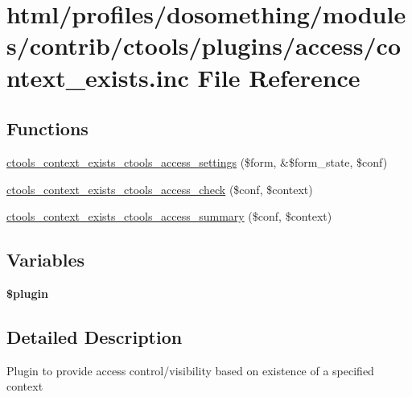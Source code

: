 \hypertarget{context__exists_8inc}{
\section{html/profiles/dosomething/modules/contrib/ctools/plugins/access/context\_\-exists.inc File Reference}
\label{context__exists_8inc}
}
\subsection*{Functions}
\begin{DoxyCompactItemize}
\item 
\hyperlink{context__exists_8inc_a32f6e23118472dc32b25c30e856d40f2}{ctools\_\-context\_\-exists\_\-ctools\_\-access\_\-settings} (\$form, \&\$form\_\-state, \$conf)
\item 
\hyperlink{context__exists_8inc_a2b18d31bf8581ca7ba9f8075c2b7bf1a}{ctools\_\-context\_\-exists\_\-ctools\_\-access\_\-check} (\$conf, \$context)
\item 
\hyperlink{context__exists_8inc_aa752c06f968eff4de8a1c652a80bfe2c}{ctools\_\-context\_\-exists\_\-ctools\_\-access\_\-summary} (\$conf, \$context)
\end{DoxyCompactItemize}
\subsection*{Variables}
\begin{DoxyCompactItemize}
\item 
{\bfseries \$plugin}
\end{DoxyCompactItemize}


\subsection{Detailed Description}
Plugin to provide access control/visibility based on existence of a specified context 

